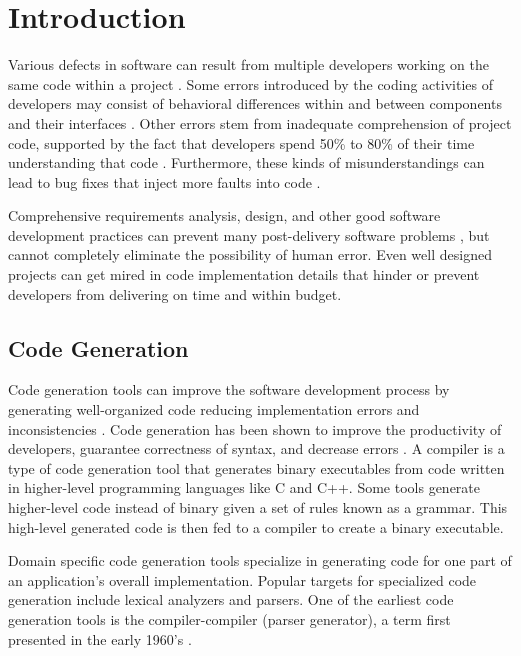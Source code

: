 \chapter{Introduction}
Various defects in software can result from multiple developers working on the same code within a project \cite{livshits_01}.  Some errors introduced by the coding activities of developers may consist of behavioral differences within and between components and their interfaces \cite{leveson_01,smidts_01,nakajo_01}.  Other errors stem from inadequate comprehension of project code, supported by the fact that developers spend 50\% to 80\% of their time understanding that code \cite{sinha_01}.  Furthermore, these kinds of misunderstandings can lead to bug fixes that inject more faults into code \cite{smidts_01}.

\indent
Comprehensive requirements analysis, design, and other good software development practices can prevent many post-delivery software problems \cite{boehm_01}, but cannot completely eliminate the possibility of human error.  Even well designed projects can get mired in code implementation details that hinder or prevent developers from delivering on time and within budget.

\section{Code Generation}
Code generation tools can improve the software development process by generating well-organized code reducing implementation errors and inconsistencies \cite{boysen_01}.  Code generation has been shown to improve the productivity of developers, guarantee correctness of syntax, and decrease errors \cite{groher_01}.  A compiler is a type of code generation tool that generates binary executables from code written in higher-level programming languages like C and C++.   Some tools generate higher-level code instead of binary given a set of rules known as a grammar.  This high-level generated code is then fed to a compiler to create a binary executable.

\indent
Domain specific code generation tools specialize in generating code for one part of an application's overall implementation.  Popular targets for specialized code generation include lexical analyzers and parsers.  One of the earliest code generation tools is the compiler-compiler (parser generator), a term first presented in the early 1960’s \cite{brooker_01}.

